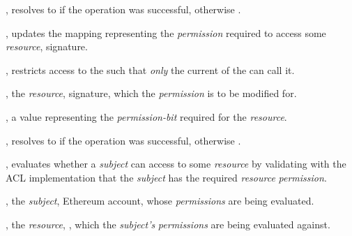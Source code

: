 \begin{code}
\begin{functions}
      \begin{returns}
        \item {}, resolves to  if the operation was
          successful, otherwise .
      \end{returns}


    \item {},
      updates the mapping representing the \emph{permission} required to access
      some \emph{resource},  signature.

      \begin{modifiers}
        \item {}, restricts access to the
           such that \emph{only} the current  of the
           can call it.
      \end{modifiers}

      \begin{parameters}
        \item {}, the \emph{resource}, 
          signature, which the \emph{permission} is to be modified for.

        \item {}, a  value representing the
          \emph{permission-bit} required for the \emph{resource}.
      \end{parameters}

      \begin{returns}
        \item {}, resolves to  if the operation was
          successful, otherwise .
      \end{returns}


    \item {}, evaluates
      whether a \emph{subject} can access to some \emph{resource} by validating
      with the ACL implementation that the \emph{subject} has the required
      \emph{resource} \emph{permission}.

      \begin{parameters}
        \item {}, the \emph{subject}, Ethereum account,
          whose \emph{permissions} are being evaluated.

        \item {}, the \emph{resource}, , which the \emph{subject's} \emph{permissions} are being
          evaluated against.
      \end{parameters}


\end{functions}
\end{code}

